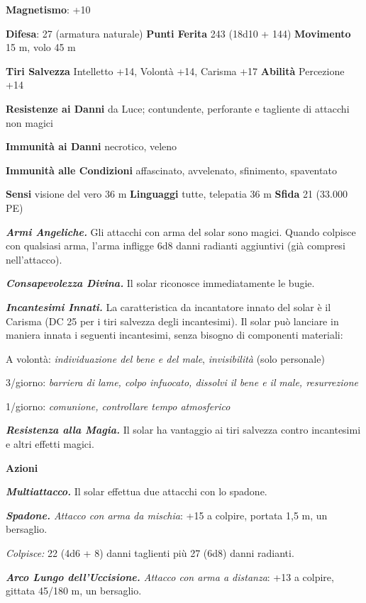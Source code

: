 \begin{multicols}{2}
\textbf{Magnetismo}: +10

\textbf{Difesa}: 27 (armatura naturale) \textbf{Punti Ferita}
243 (18d10 + 144) \textbf{Movimento} 15 m, volo 45 m

\textbf{Tiri Salvezza} Intelletto +14, Volontà +14, Carisma +17
\textbf{Abilità} Percezione +14

\textbf{Resistenze ai Danni} da Luce; contundente, perforante e
tagliente di attacchi non magici

\textbf{Immunità ai Danni} necrotico, veleno

\textbf{Immunità alle Condizioni} affascinato, avvelenato, sfinimento,
spaventato

\textbf{Sensi} visione del vero 36 m
\textbf{Linguaggi} tutte, telepatia 36 m \textbf{Sfida} 21 (33.000 PE)

\emph{\textbf{Armi Angeliche.}} Gli attacchi con arma del solar sono
magici. Quando colpisce con qualsiasi arma, l'arma infligge 6d8 danni
radianti aggiuntivi (già compresi nell'attacco).

\emph{\textbf{Consapevolezza Divina.}} Il solar riconosce immediatamente
le bugie.

\emph{\textbf{Incantesimi Innati.}} La caratteristica da incantatore
innato del solar è il Carisma (DC 25 per i tiri salvezza degli
incantesimi). Il solar può lanciare in maniera innata i seguenti
incantesimi, senza bisogno di componenti materiali:

A volontà: \emph{individuazione del bene e del male},
\emph{invisibilità} (solo personale)

3/giorno: \emph{barriera di lame, colpo infuocato, dissolvi il bene e
il} \emph{male, resurrezione}

1/giorno: \emph{comunione, controllare tempo atmosferico}

\emph{\textbf{Resistenza alla Magia.}} Il solar ha vantaggio ai tiri
salvezza contro incantesimi e altri effetti magici.

\textbf{Azioni}

\emph{\textbf{Multiattacco.}} Il solar effettua due attacchi con lo
spadone.

\emph{\textbf{Spadone.} Attacco con arma da mischia}: +15 a colpire,
portata 1,5 m, un bersaglio.

\emph{Colpisce:} 22 (4d6 + 8) danni taglienti più 27 (6d8) danni
radianti.

\emph{\textbf{Arco Lungo dell'Uccisione.} Attacco con arma a distanza}:
+13 a colpire, gittata 45/180 m, un bersaglio.


\end{multicols}
